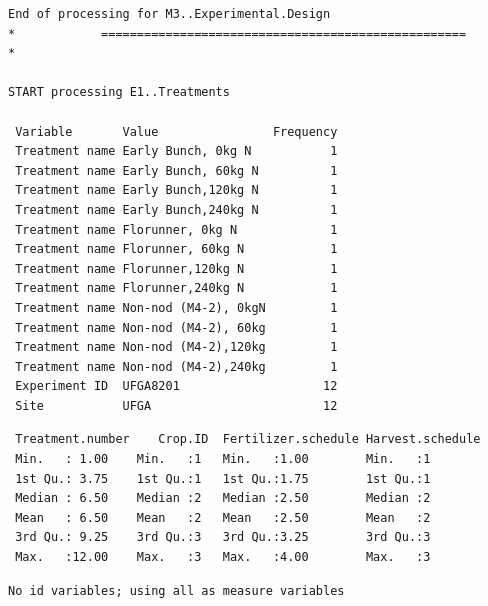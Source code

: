 \documentclass[
]{article}
\begin{document}
\begin{verbatim}
End of processing for M3..Experimental.Design
*            ===================================================            *

START processing E1..Treatments

 Variable       Value                Frequency
 Treatment name Early Bunch, 0kg N           1
 Treatment name Early Bunch, 60kg N          1
 Treatment name Early Bunch,120kg N          1
 Treatment name Early Bunch,240kg N          1
 Treatment name Florunner, 0kg N             1
 Treatment name Florunner, 60kg N            1
 Treatment name Florunner,120kg N            1
 Treatment name Florunner,240kg N            1
 Treatment name Non-nod (M4-2), 0kgN         1
 Treatment name Non-nod (M4-2), 60kg         1
 Treatment name Non-nod (M4-2),120kg         1
 Treatment name Non-nod (M4-2),240kg         1
 Experiment ID  UFGA8201                    12
 Site           UFGA                        12
\end{verbatim}

\begin{verbatim}
 Treatment.number    Crop.ID  Fertilizer.schedule Harvest.schedule
 Min.   : 1.00    Min.   :1   Min.   :1.00        Min.   :1       
 1st Qu.: 3.75    1st Qu.:1   1st Qu.:1.75        1st Qu.:1       
 Median : 6.50    Median :2   Median :2.50        Median :2       
 Mean   : 6.50    Mean   :2   Mean   :2.50        Mean   :2       
 3rd Qu.: 9.25    3rd Qu.:3   3rd Qu.:3.25        3rd Qu.:3       
 Max.   :12.00    Max.   :3   Max.   :4.00        Max.   :3       
\end{verbatim}

\begin{verbatim}
No id variables; using all as measure variables
\end{verbatim}
\end{document}
